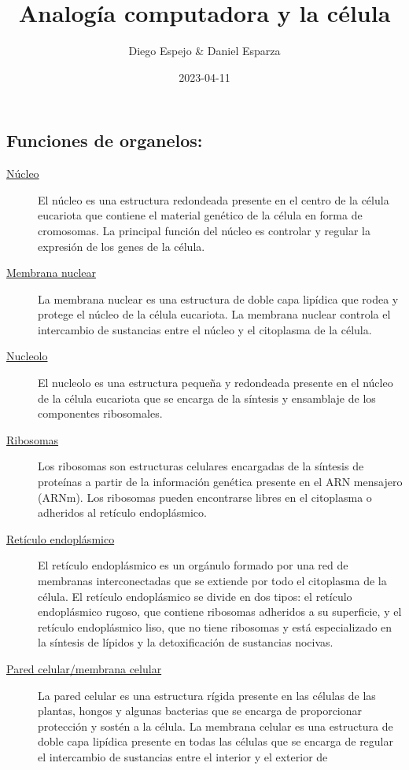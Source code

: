 \documentclass[
]{article}
\title{Analogía computadora y la célula}
\author{Diego Espejo \& Daniel Esparza}
\date{2023-04-11}
\begin{document}
\maketitle

\hypertarget{funciones-de-organelos}{%
\subsection{Funciones de organelos:}\label{funciones-de-organelos}}

\begin{description}
\item[\uline{Núcleo}]
El núcleo es una estructura redondeada presente en el centro de la
célula eucariota que contiene el material genético de la célula en forma
de cromosomas. La principal función del núcleo es controlar y regular la
expresión de los genes de la célula.
\item[\uline{Membrana nuclear}]
La membrana nuclear es una estructura de doble capa lipídica que rodea y
protege el núcleo de la célula eucariota. La membrana nuclear controla
el intercambio de sustancias entre el núcleo y el citoplasma de la
célula.
\item[\uline{Nucleolo}]
El nucleolo es una estructura pequeña y redondeada presente en el núcleo
de la célula eucariota que se encarga de la síntesis y ensamblaje de los
componentes ribosomales.
\item[\uline{Ribosomas}]
Los ribosomas son estructuras celulares encargadas de la síntesis de
proteínas a partir de la información genética presente en el ARN
mensajero (ARNm). Los ribosomas pueden encontrarse libres en el
citoplasma o adheridos al retículo endoplásmico.
\item[\uline{Retículo endoplásmico}]
El retículo endoplásmico es un orgánulo formado por una red de membranas
interconectadas que se extiende por todo el citoplasma de la célula. El
retículo endoplásmico se divide en dos tipos: el retículo endoplásmico
rugoso, que contiene ribosomas adheridos a su superficie, y el retículo
endoplásmico liso, que no tiene ribosomas y está especializado en la
síntesis de lípidos y la detoxificación de sustancias nocivas.
\item[\uline{Pared celular/membrana celular}]
La pared celular es una estructura rígida presente en las células de las
plantas, hongos y algunas bacterias que se encarga de proporcionar
protección y sostén a la célula. La membrana celular es una estructura
de doble capa lipídica presente en todas las células que se encarga de
regular el intercambio de sustancias entre el interior y el exterior de

\end{description}
\end{document}
